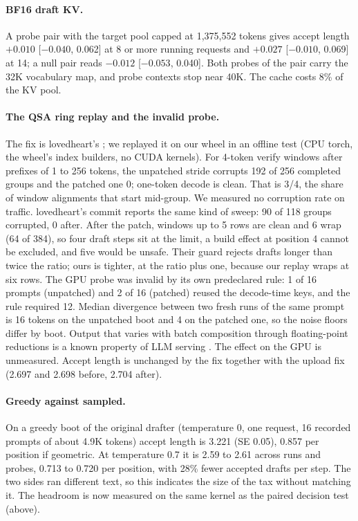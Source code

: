 \paragraph{BF16 draft KV.}
A probe pair with the target pool capped at 1,375,552 tokens gives accept length $+0.010$ [$-0.040$, 0.062] at 8 or more running requests and $+0.027$ [$-0.010$, 0.069] at 14; a null pair reads $-0.012$ [$-0.053$, 0.040]. Both probes of the pair carry the 32K vocabulary map, and probe contexts stop near 40K. The cache costs 8\% of the KV pool. %

\paragraph{The QSA ring replay and the invalid probe.}
The fix is lovedheart's \citep{lovedheart2026qsa}; we replayed it on our wheel in an offline test (CPU torch, the wheel's index builders, no CUDA kernels). %
For 4-token verify windows after prefixes of 1 to 256 tokens, the unpatched stride corrupts 192 of 256 completed groups and the patched one 0; one-token decode is clean. That is 3/4, the share of window alignments that start mid-group. We measured no corruption rate on traffic. %
lovedheart's commit reports the same kind of sweep: 90 of 118 groups corrupted, 0 after. %
After the patch, windows up to 5 rows are clean and 6 wrap (64 of 384), so four draft steps sit at the limit, a build effect at position 4 cannot be excluded, and five would be unsafe. Their guard rejects drafts longer than twice the ratio; ours is tighter, at the ratio plus one, because our replay wraps at six rows. %
The GPU probe was invalid by its own predeclared rule: 1 of 16 prompts (unpatched) and 2 of 16 (patched) reused the decode-time keys, and the rule required 12. %
Median divergence between two fresh runs of the same prompt is 16 tokens on the unpatched boot and 4 on the patched one, so the noise floors differ by boot. Output that varies with batch composition through floating-point reductions is a known property of LLM serving \citep{he2025nondeterminism,yuan2025numerical}. %
The effect on the GPU is unmeasured. Accept length is unchanged by the fix together with the upload fix (2.697 and 2.698 before, 2.704 after). %

\paragraph{Greedy against sampled.}
On a greedy boot of the original drafter (temperature 0, one request, 16 recorded prompts of about 4.9K tokens) accept length is 3.221 (SE 0.05), 0.857 per position if geometric. At temperature 0.7 it is 2.59 to 2.61 across runs and probes, 0.713 to 0.720 per position, with 28\% fewer accepted drafts per step. %
The two sides ran different text, so this indicates the size of the tax without matching it. The headroom is now measured on the same kernel as the paired decision test (above). %


